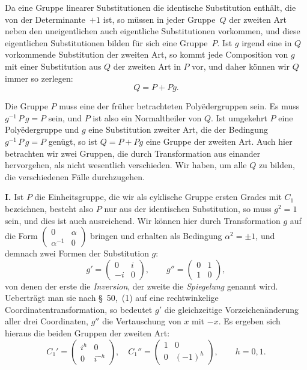 \documentclass[12pt,a4paper]{article}
\theoremstyle{plain}
\theoremstyle{definition}
\theoremstyle{remark}
\begin{document}
Da eine Gruppe linearer Substitutionen die identische Substitution enth\"alt, die von der Determinante~$+1$ ist, so m\"ussen in jeder Gruppe~$Q$ der zweiten Art neben den uneigentlichen auch eigentliche Substitutionen vorkommen, und diese eigentlichen Substitutionen bilden f\"ur sich eine Gruppe~$P$. Ist $g$ irgend eine in $Q$ vorkommende Substitution der zweiten Art, so kommt jede Composition von $g$ mit einer Substitution aus $Q$ der zweiten Art in $P$ vor, und daher k\"onnen wir $Q$ immer so zerlegen:
\begin{equation}\tag{1}
Q = P + Pg.
\end{equation}

Die Gruppe $P$ muss eine der fr\"uher betrachteten Poly\"edergruppen sein. Es muss $g^{-1}\,P\,g = P$ sein, und $P$ ist also ein Normaltheiler von $Q$. Ist umgekehrt $P$ eine Poly\"edergruppe und $g$ eine Substitution zweiter Art, die der Bedingung $g^{-1}\,P\,g = P$ gen\"ugt, so ist $Q = P + Pg$ eine Gruppe der zweiten Art.
Auch hier betrachten wir zwei Gruppen, die durch Transformation aus einander hervorgehen, als nicht wesentlich verschieden. Wir haben, um alle $Q$ zu bilden, die verschiedenen F\"alle durchzugehen.

\medskip\noindent\textbf{I.} Ist $P$ die Einheitsgruppe, die wir als cyklische Gruppe ersten Grades mit $C_{1}$ bezeichnen, besteht also $P$ nur aus der identischen Substitution, so muss $g^{2} = 1$ sein, und dies ist auch ausreichend. Wir k\"onnen hier durch Transformation $g$ auf die Form $\begin{pmatrix}0 & \alpha \\ \alpha^{-1} & 0\end{pmatrix}$ bringen und erhalten als Bedingung $\alpha^{2} = \pm 1$, und demnach zwei Formen der Substitution $g$:
\[
g' = \begin{pmatrix} 0 & i \\ -i & 0 \end{pmatrix},\qquad
g'' = \begin{pmatrix} 0 & 1 \\ 1 & 0 \end{pmatrix},
\]
von denen der erste die \emph{Inversion}, der zweite die \emph{Spiegelung} genannt wird. Uebertr\"agt man sie nach \S~50,~(1) auf eine rechtwinkelige Coordinatentransformation, so bedeutet $g'$ die gleichzeitige Vorzeichen\"anderung aller drei Coordinaten, $g''$ die Vertauschung von $x$ mit $-x$. Es ergeben sich hieraus die beiden Gruppen der zweiten Art:
\begin{equation}\tag{2}
C_{1}' = \begin{pmatrix} i^{h} & 0 \\ 0 & i^{-h} \end{pmatrix},\quad
C_{1}'' = \begin{pmatrix} 1 & 0 \\ 0 & (-1)^{h} \end{pmatrix},\qquad h = 0, 1.
\end{equation}
\end{document}
